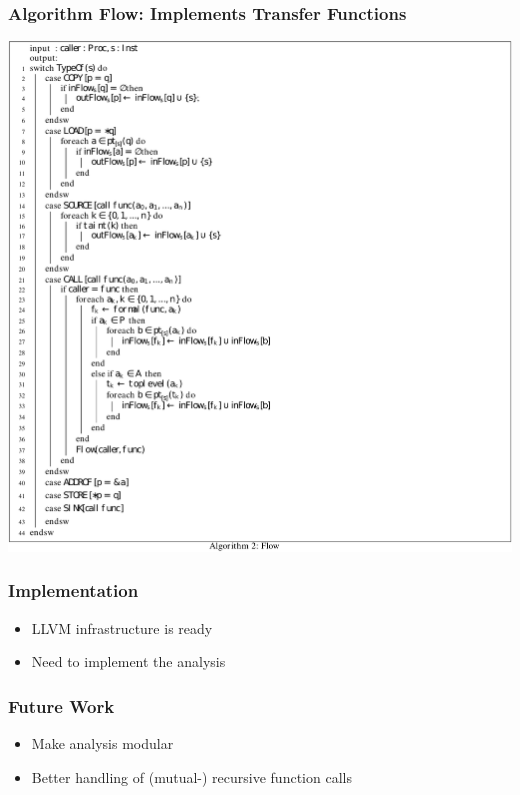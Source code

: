 \documentclass[xcolor=dvipsnames]{beamer}
\begin{document}
\begin{frame}
  \frametitle{Algorithm Flow: Implements Transfer Functions} 
    {\small
	\begin{center}
	\includegraphics[scale=0.45]{flow}
	\end{center}   
	}
\end{frame}

\begin{frame}
  \frametitle{Implementation} {
   \Large
	\begin{itemize}
	\item LLVM infrastructure is ready
	\vspace{0.5cm}
	\item Need to implement the analysis	
	\end{itemize}   
	}
\end{frame}


\begin{frame}
  \frametitle{Future Work} {
   \Large
	\begin{itemize}
	\item Make analysis modular
	\vspace{0.5cm}	
	\item Better handling of (mutual-) recursive function calls
	\end{itemize}   
	}
\end{frame}
\end{document}
